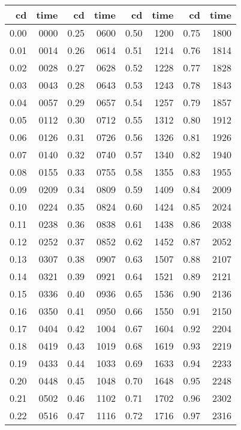 \documentclass[10pt]{book}
\begin{document}
\begin{center}
\begin{tabular}{rr|rr|rr|rr}
        \toprule
        \textbf{cd} & \textbf{time} &\textbf{cd} & \textbf{time} &\textbf{cd} & \textbf{time} &\textbf{cd} & \textbf{time} \\
        \midrule
        0.00 & 0000 & 0.25 & 0600 & 0.50 & 1200 & 0.75 & 1800 \\
        0.01 & 0014 & 0.26 & 0614 & 0.51 & 1214 & 0.76 & 1814 \\
        0.02 & 0028 & 0.27 & 0628 & 0.52 & 1228 & 0.77 & 1828 \\
        0.03 & 0043 & 0.28 & 0643 & 0.53 & 1243 & 0.78 & 1843 \\
        0.04 & 0057 & 0.29 & 0657 & 0.54 & 1257 & 0.79 & 1857 \\
        0.05 & 0112 & 0.30 & 0712 & 0.55 & 1312 & 0.80 & 1912 \\
        0.06 & 0126 & 0.31 & 0726 & 0.56 & 1326 & 0.81 & 1926 \\
        0.07 & 0140 & 0.32 & 0740 & 0.57 & 1340 & 0.82 & 1940 \\
        0.08 & 0155 & 0.33 & 0755 & 0.58 & 1355 & 0.83 & 1955 \\
        0.09 & 0209 & 0.34 & 0809 & 0.59 & 1409 & 0.84 & 2009 \\
        0.10 & 0224 & 0.35 & 0824 & 0.60 & 1424 & 0.85 & 2024 \\
        0.11 & 0238 & 0.36 & 0838 & 0.61 & 1438 & 0.86 & 2038 \\
        0.12 & 0252 & 0.37 & 0852 & 0.62 & 1452 & 0.87 & 2052 \\
        0.13 & 0307 & 0.38 & 0907 & 0.63 & 1507 & 0.88 & 2107 \\
        0.14 & 0321 & 0.39 & 0921 & 0.64 & 1521 & 0.89 & 2121 \\
        0.15 & 0336 & 0.40 & 0936 & 0.65 & 1536 & 0.90 & 2136 \\
        0.16 & 0350 & 0.41 & 0950 & 0.66 & 1550 & 0.91 & 2150 \\
        0.17 & 0404 & 0.42 & 1004 & 0.67 & 1604 & 0.92 & 2204 \\
        0.18 & 0419 & 0.43 & 1019 & 0.68 & 1619 & 0.93 & 2219 \\
        0.19 & 0433 & 0.44 & 1033 & 0.69 & 1633 & 0.94 & 2233 \\
        0.20 & 0448 & 0.45 & 1048 & 0.70 & 1648 & 0.95 & 2248 \\
        0.21 & 0502 & 0.46 & 1102 & 0.71 & 1702 & 0.96 & 2302 \\
        0.22 & 0516 & 0.47 & 1116 & 0.72 & 1716 & 0.97 & 2316 \\

\end{tabular}
\end{center}
\end{document}
